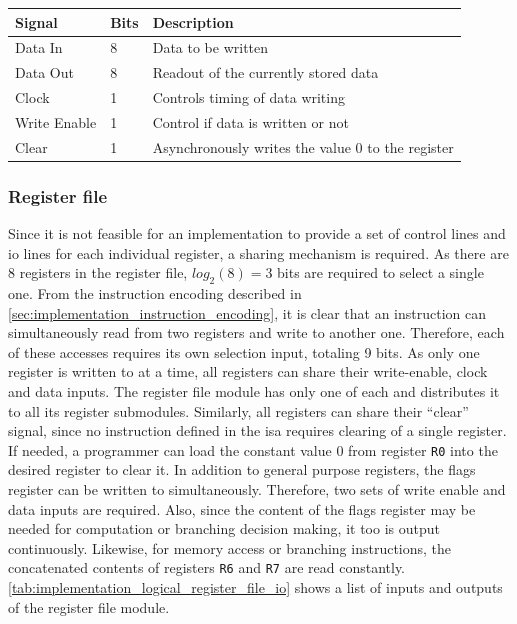 \begin{table}[H]
    \centering
    \begin{tabular}{|l|l|l|} 
        \hline
        \textbf{\textbf{Signal}} & \textbf{Bits}           & \textbf{Description}                               \\ 
        \hline
        Data In                  & 8                       & Data to be written                                 \\ 
        \hline
        Data Out                 & 8                       & Readout of the currently stored data               \\ 
        \hline
        Clock                    & 1                       & Controls timing of data writing                    \\ 
        \hline
        Write Enable             & 1                       & Control if data is written or not                  \\ 
        \hline
        Clear                    & 1                       & Asynchronously writes the value 0 to the register  \\
        \hline
    \end{tabular}
\end{table}
\caption{Input and output signals of an individual register}
\label{tab:implementation_logical_register_io}

\subsubsection{Register file}

Since it is not feasible for an implementation to provide a set of control lines and \ac{io} lines for each individual register, a sharing mechanism is required. As there are 8 registers in the register file, $log_2(8) = 3$ bits are required to select a single one. From the instruction encoding described in \autoref{sec:implementation_instruction_encoding}, it is clear that an instruction can simultaneously read from two registers and write to another one. Therefore, each of these accesses requires its own selection input, totaling 9 bits. As only one register is written to at a time, all registers can share their write-enable, clock and data inputs. The register file module has only one of each and distributes it to all its register submodules. Similarly, all registers can share their ``clear'' signal, since no instruction defined in the \ac{isa} requires clearing of a single register. If needed, a programmer can load the constant value 0 from register \texttt{R0} into the desired register to clear it. In addition to general purpose registers, the flags register can be written to simultaneously. Therefore, two sets of write enable and data inputs are required. Also, since the content of the flags register may be needed for computation or branching decision making, it too is output continuously. Likewise, for memory access or branching instructions, the concatenated contents of registers \texttt{R6} and \texttt{R7} are read constantly. \autoref{tab:implementation_logical_register_file_io} shows a list of inputs and outputs of the register file module.

